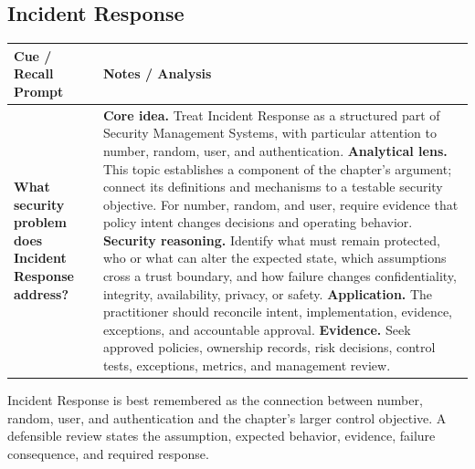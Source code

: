 \documentclass[11pt]{article}
\newcommand{\CornellHeader}{%
\rowcolor{Navy}\color{white}\bfseries Cue / Recall Prompt & \color{white}\bfseries Notes / Analysis\\\hline}
\newcommand{\CornellRow}[2]{%
\cellcolor{CueGray}\RaggedRight\textbf{#1} & \RaggedRight #2\\\hline}
\begin{document}
\subsection*{Incident Response}
\begin{longtable}{>{\RaggedRight\arraybackslash}p{}|>{\RaggedRight\arraybackslash}p{}}
\CornellHeader
\CornellRow{What security problem does Incident Response address?}{\textbf{Core idea.} Treat Incident Response as a structured part of Security Management Systems, with particular attention to number, random, user, and authentication. \textbf{Analytical lens.} This topic establishes a component of the chapter's argument; connect its definitions and mechanisms to a testable security objective. For number, random, and user, require evidence that policy intent changes decisions and operating behavior. \textbf{Security reasoning.} Identify what must remain protected, who or what can alter the expected state, which assumptions cross a trust boundary, and how failure changes confidentiality, integrity, availability, privacy, or safety. \textbf{Application.} The practitioner should reconcile intent, implementation, evidence, exceptions, and accountable approval. \textbf{Evidence.} Seek approved policies, ownership records, risk decisions, control tests, exceptions, metrics, and management review.}
\end{longtable}
\begin{topicsummary}
Incident Response is best remembered as the connection between number, random, user, and authentication and the chapter's larger control objective. A defensible review states the assumption, expected behavior, evidence, failure consequence, and required response.
\end{topicsummary}
\end{document}
